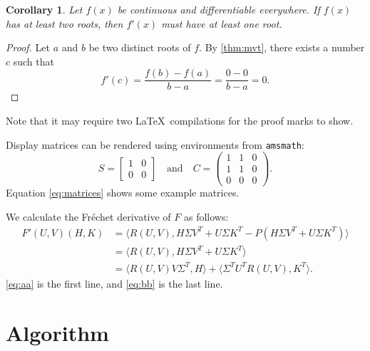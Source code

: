 \documentclass[10pt,reqno,final]{article}
\theoremstyle{plain}
\newtheorem{corollary}[theorem]{Corollary}
\theoremstyle{definition}
\theoremstyle{remark}
\begin{document}

\begin{corollary}\label{cor:a}
  Let $f(x)$ be continuous and differentiable everywhere. If $f(x)$
  has at least two roots, then $f'(x)$ must have at least one root.
\end{corollary}
\begin{proof}
  Let $a$ and $b$ be two distinct roots of $f$.
  By \ref{thm:mvt}, there exists a number $c$ such that
  \begin{equation*}
    f'(c) = \frac{f(b)-f(a)}{b-a} = \frac{0-0}{b-a} = 0.
  \end{equation*}
\end{proof}

Note that it may require two \LaTeX\ compilations for the proof marks
to show.

Display matrices can be rendered using environments from \texttt{amsmath}:
\begin{equation}\label{eq:matrices}
S=\begin{bmatrix}1&0\\0&0\end{bmatrix}
\quad\text{and}\quad
C=\begin{pmatrix}1&1&0\\1&1&0\\0&0&0\end{pmatrix}.
\end{equation}
Equation \ref{eq:matrices} shows some example matrices.

We calculate the Fr\'{e}chet derivative of $F$ as follows:
\begin{subequations}
\begin{align}
  F'(U,V)(H,K)
  &= \langle R(U,V),H\Sigma V^{T} + U\Sigma K^{T} -
  P(H\Sigma V^{T} + U\Sigma K^{T})\rangle \label{eq:aa} \\
  &= \langle R(U,V),H\Sigma V^{T} + U\Sigma K^{T}\rangle
  \nonumber \\
  &= \langle R(U,V)V\Sigma^{T},H\rangle +
  \langle \Sigma^{T}U^{T}R(U,V),K^{T}\rangle. \label{eq:bb}
\end{align}
\end{subequations}
\ref{eq:aa} is the first line, and \ref{eq:bb} is the last line.

\section{Algorithm}
\label{sec:alg}
\end{document}
